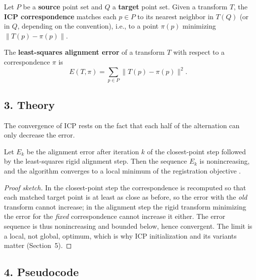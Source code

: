\begin{definition}\label{def:match_icp}
  Let $P$ be a \textbf{source} point set and $Q$ a \textbf{target} point
  set. Given a transform $T$, the \textbf{ICP correspondence} matches each
  $p \in P$ to its nearest neighbor in $T(Q)$ (or in $Q$, depending on the
  convention), i.e., to a point $\pi(p)$ minimizing $\|T(p) - \pi(p)\|$.
\end{definition}

\begin{definition}\label{def:match_icp_error}
  The \textbf{least-squares alignment error} of a transform $T$ with respect
  to a correspondence $\pi$ is
  \[
    E(T, \pi) = \sum_{p \in P} \|T(p) - \pi(p)\|^2 .
  \]
\end{definition}

\subsection{3. Theory}

The convergence of ICP rests on the fact that each half of the alternation
can only decrease the error.

\begin{theorem}\label{thm:match_icp_convergence}
  Let $E_k$ be the alignment error after iteration $k$ of the closest-point
  step followed by the least-squares rigid alignment step. Then the sequence
  $E_k$ is nonincreasing, and the algorithm converges to a local minimum of
  the registration objective \cite{besl1992}.
\end{theorem}

\begin{proof}[Proof sketch]
  In the closest-point step the correspondence is recomputed so that each
  matched target point is at least as close as before, so the error with the
  \emph{old} transform cannot increase; in the alignment step the rigid
  transform minimizing the error for the \emph{fixed} correspondence cannot
  increase it either. The error sequence is thus nonincreasing and bounded
  below, hence convergent. The limit is a local, not global, optimum, which
  is why ICP initialization and its variants matter (Section~5).
\end{proof}

\subsection{4. Pseudocode}

